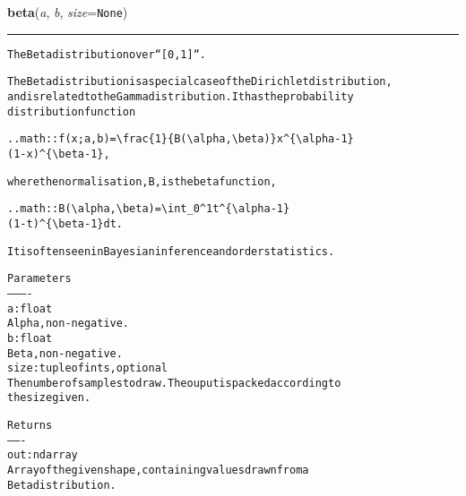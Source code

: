 \hspace{.8\funcindent}\begin{boxedminipage}{\funcwidth}

    \raggedright \textbf{beta}(\textit{a}, \textit{b}, \textit{size}={\tt None})

    \vspace{-1.5ex}

    \rule{\textwidth}{0.5\fboxrule}
\setlength{\parskip}{2ex}
\begin{alltt}
The Beta distribution over ``[0, 1]``.

The Beta distribution is a special case of the Dirichlet distribution,
and is related to the Gamma distribution.  It has the probability
distribution function

.. math:: f(x; a,b) = {\textbackslash}frac\{1\}\{B({\textbackslash}alpha, {\textbackslash}beta)\} x{\textasciicircum}\{{\textbackslash}alpha - 1\}
                                                 (1 - x){\textasciicircum}\{{\textbackslash}beta - 1\},

where the normalisation, B, is the beta function,

.. math:: B({\textbackslash}alpha, {\textbackslash}beta) = {\textbackslash}int\_0{\textasciicircum}1 t{\textasciicircum}\{{\textbackslash}alpha - 1\}
                             (1 - t){\textasciicircum}\{{\textbackslash}beta - 1\} dt.

It is often seen in Bayesian inference and order statistics.

Parameters
----------
a : float
    Alpha, non-negative.
b : float
    Beta, non-negative.
size : tuple of ints, optional
    The number of samples to draw.  The ouput is packed according to
    the size given.

Returns
-------
out : ndarray
    Array of the given shape, containing values drawn from a
    Beta distribution.
\end{alltt}

\setlength{\parskip}{1ex}
    \end{boxedminipage}

    \label{QSTK:qstklearn:mldiagnostics:binomial}

    \vspace{0.5ex}

